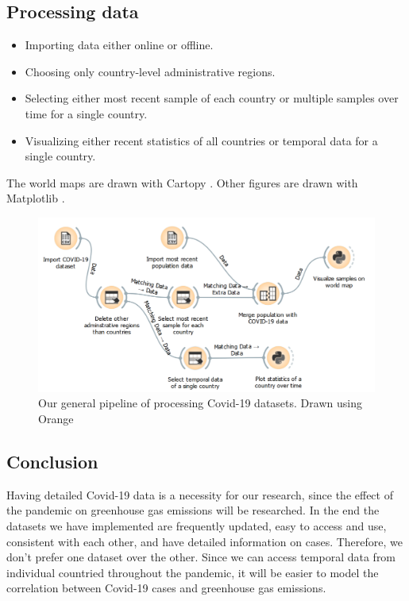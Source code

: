\subsection{Processing data}

\begin{itemize}
	\item Importing data either online or offline.
	\item Choosing only country-level administrative regions.
	\item Selecting either most recent sample of each country or multiple samples over time for a single country.
	\item Visualizing either recent statistics of all countries or temporal data for a single country.
\end{itemize}
The world maps are drawn with Cartopy \cite{Cartopy}. Other figures are drawn with Matplotlib \cite{Hunter:2007}.

\begin{figure}[h]
	\centering
	\includegraphics[width=0.80\linewidth]{covid/data_pipeline}
	\caption{Our general pipeline of processing Covid-19 datasets. Drawn using Orange \cite{Orange}}
\end{figure}


\subsection{Conclusion}
Having detailed Covid-19 data is a necessity for our research, since the effect of the pandemic on greenhouse gas emissions will be researched. In the end the datasets we have implemented are frequently updated, easy to access and use, consistent with each other, and have detailed information on cases. Therefore, we don't prefer one dataset over the other. Since we can access temporal data from individual countried throughout the pandemic, it will be easier to model the correlation between Covid-19 cases and greenhouse gas emissions.